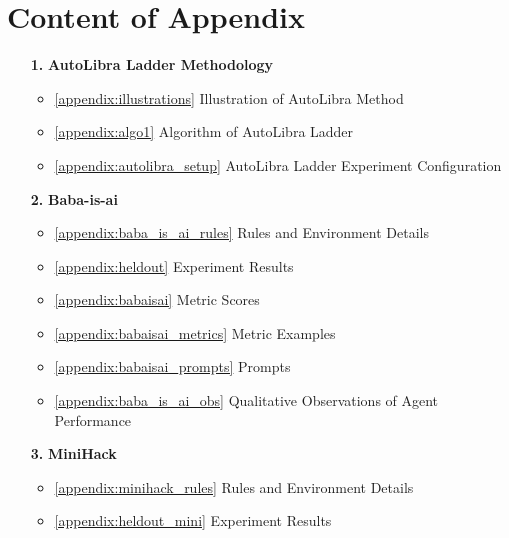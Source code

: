 \documentclass[../main.tex]{subfiles}
\begin{document}
    \section*{Content of Appendix}
    \begin{itemize}
        \item[\textbf{1.}] \textbf{AutoLibra Ladder Methodology}
            \begin{itemize}
                \item \ref{appendix:illustrations} Illustration of AutoLibra Method

                \item \ref{appendix:algo1} Algorithm of AutoLibra Ladder

                \item \ref{appendix:autolibra_setup} AutoLibra Ladder Experiment
                    Configuration
            \end{itemize}

        \item[\textbf{2.}] \textbf{Baba-is-ai}
            \begin{itemize}
                \item \ref{appendix:baba_is_ai_rules} Rules and Environment Details

                \item \ref{appendix:heldout} Experiment Results

                \item \ref{appendix:babaisai} Metric Scores

                \item \ref{appendix:babaisai_metrics} Metric Examples

                \item \ref{appendix:babaisai_prompts} Prompts

                \item \ref{appendix:baba_is_ai_obs} Qualitative Observations of Agent
                    Performance
            \end{itemize}

        \item[\textbf{3.}] \textbf{MiniHack}
            \begin{itemize}
                \item \ref{appendix:minihack_rules} Rules and Environment Details

                \item \ref{appendix:heldout_mini} Experiment Results


\end{itemize}
\end{itemize}
\end{document}
